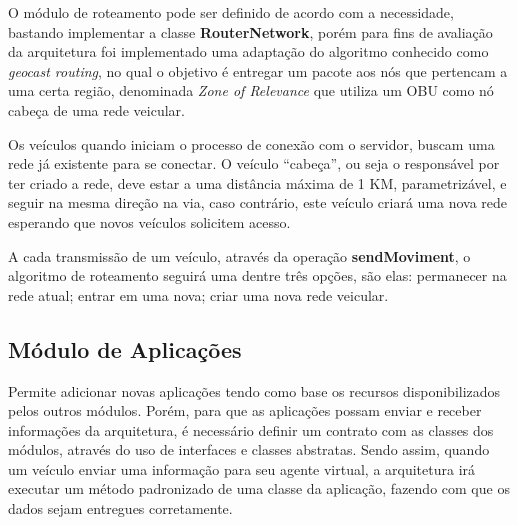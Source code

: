 \documentclass[
	12pt,				%
	oneside,			%
	a4paper,			%
	english,			%
	brazil				%
	]{abntex2ppgsi}
\begin{document}
O módulo de roteamento pode ser definido de acordo com a necessidade, bastando implementar a classe \textbf{RouterNetwork}, porém para fins de avaliação da arquitetura foi implementado uma adaptação do algoritmo conhecido como \textit{geocast routing}, no qual o objetivo é entregar um pacote aos nós que pertencam a uma certa região, denominada \textit{Zone of Relevance} que utiliza um OBU como nó cabeça de uma rede veicular.

Os veículos quando iniciam o processo de conexão com o servidor, buscam uma rede  já existente para se conectar. O veículo ``cabeça'', ou seja o responsável por ter criado a rede, deve estar a uma distância máxima de 1 KM, parametrizável, e seguir na mesma direção na via, caso contrário, este veículo criará uma nova rede esperando que novos veículos solicitem acesso.

A cada transmissão de um veículo, através da operação \textbf{sendMoviment}, o algoritmo de roteamento seguirá uma dentre três opções, são elas: permanecer na rede atual; entrar em uma nova; criar uma nova rede veicular.




\subsection{Módulo de Aplicações}
Permite adicionar novas aplicações tendo como base os recursos disponibilizados pelos outros módulos. Porém, para que as aplicações possam enviar e receber informações da arquitetura, é necessário definir um contrato com as classes dos módulos, através do uso de interfaces e classes abstratas. Sendo assim, quando um veículo enviar uma informação para seu agente virtual, a arquitetura irá executar um método padronizado de uma classe da aplicação, fazendo com que os dados sejam entregues corretamente.
\end{document}
